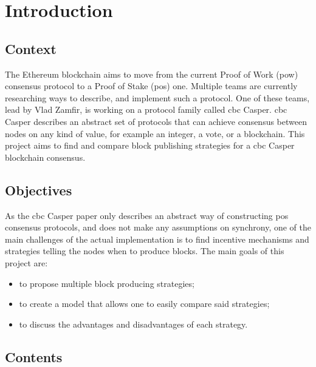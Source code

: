 \chapter{Introduction}
\label{chap:introduction}

\section{Context}

The Ethereum blockchain aims to move from the current Proof of Work (\gls{pow})
consensus protocol to a Proof of Stake (\gls{pos}) one. Multiple teams are
currently researching ways to describe, and implement such a protocol. One of
these teams, lead by Vlad Zamfir, is working on a protocol family called
\gls{cbc} Casper.  \gls{cbc} Casper describes an abstract set of protocols that
can achieve consensus between nodes on any kind of value, for example an integer, a vote,
or a blockchain. This project aims to find and compare block publishing
strategies for a \gls{cbc} Casper blockchain consensus.

\section{Objectives}
As the \gls{cbc} Casper paper only describes an abstract way of constructing
\gls{pos} consensus protocols, and does not make any assumptions on synchrony,
one of the main challenges of the actual implementation is to find incentive
mechanisms and strategies telling the nodes when to produce blocks.  The main
goals of this project are:

\begin{itemize}
        \item to propose multiple block producing strategies;
        \item to create a model that allows one to easily compare said strategies;
        \item to discuss the advantages and disadvantages of each strategy.
\end{itemize}

\section{Contents}


